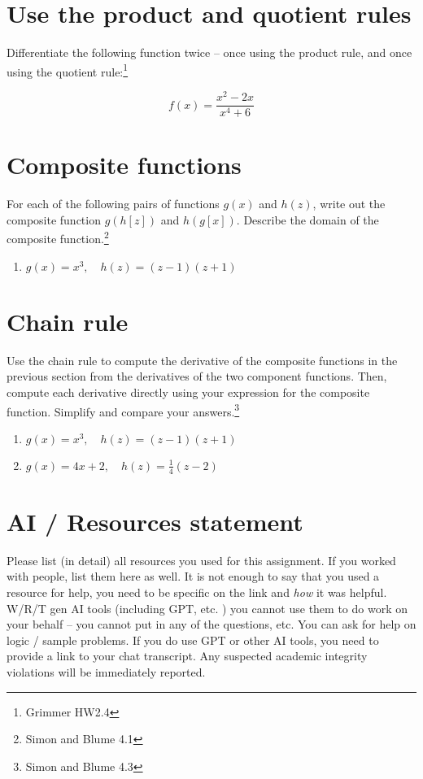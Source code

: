 \documentclass[
  letterpaper,
  DIV=11,
  numbers=noendperiod]{scrartcl}
\begin{document}
\hypertarget{use-the-product-and-quotient-rules}{%
\section{Use the product and quotient
rules}\label{use-the-product-and-quotient-rules}}

Differentiate the following function twice -- once using the product
rule, and once using the quotient rule:\footnote{Grimmer HW2.4}

\[f(x) = \dfrac{x^2-2x}{x^4 + 6}\]

\hypertarget{composite-functions}{%
\section{Composite functions}\label{composite-functions}}

For each of the following pairs of functions \(g(x)\) and \(h(z)\),
write out the composite function \(g(h[z])\) and \(h(g[x])\). Describe
the domain of the composite function.\footnote{Simon and Blume 4.1}

\begin{enumerate}
\def\labelenumi{\alph{enumi}.}
\item
  \(g(x) = x^3, \quad h(z) = (z - 1)(z + 1)\)
\end{enumerate}

\hypertarget{chain-rule}{%
\section{Chain rule}\label{chain-rule}}

Use the chain rule to compute the derivative of the composite functions
in the previous section from the derivatives of the two component
functions. Then, compute each derivative directly using your expression
for the composite function. Simplify and compare your
answers.\footnote{Simon and Blume 4.3}

\begin{enumerate}
\def\labelenumi{\alph{enumi}.}
\item
  \(g(x) = x^3, \quad h(z) = (z - 1)(z + 1)\)
\item
  \(g(x) = 4x + 2, \quad h(z) = \frac{1}{4}(z - 2)\)
\end{enumerate}

\hypertarget{ai-resources-statement}{%
\section{AI / Resources statement}\label{ai-resources-statement}}

Please list (in detail) all resources you used for this assignment. If
you worked with people, list them here as well. It is not enough to say
that you used a resource for help, you need to be specific on the link
and \emph{how} it was helpful. W/R/T gen AI tools (including GPT, etc. )
you cannot use them to do work on your behalf -- you cannot put in any
of the questions, etc. You can ask for help on logic / sample problems.
If you do use GPT or other AI tools, you need to provide a link to your
chat transcript. Any suspected academic integrity violations will be
immediately reported.
\end{document}
